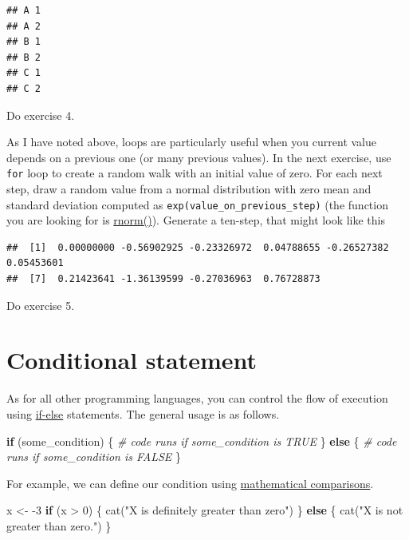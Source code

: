 \documentclass[
]{book}
\newenvironment{Shaded}{\begin{snugshade}}{\end{snugshade}}
\newcommand{\CommentTok}[1]{\textcolor[rgb]{0.56,0.35,0.01}{\textit{#1}}}
\newcommand{\ControlFlowTok}[1]{\textcolor[rgb]{0.13,0.29,0.53}{\textbf{#1}}}
\newcommand{\DecValTok}[1]{\textcolor[rgb]{0.00,0.00,0.81}{#1}}
\newcommand{\FunctionTok}[1]{\textcolor[rgb]{0.00,0.00,0.00}{#1}}
\newcommand{\NormalTok}[1]{#1}
\newcommand{\OtherTok}[1]{\textcolor[rgb]{0.56,0.35,0.01}{#1}}
\newcommand{\SpecialCharTok}[1]{\textcolor[rgb]{0.00,0.00,0.00}{#1}}
\newcommand{\StringTok}[1]{\textcolor[rgb]{0.31,0.60,0.02}{#1}}
\begin{document}
\begin{verbatim}
## A 1 
## A 2 
## B 1 
## B 2 
## C 1 
## C 2
\end{verbatim}

Do exercise 4.

As I have noted above, loops are particularly useful when you current value depends on a previous one (or many previous values). In the next exercise, use \texttt{for} loop to create a random walk with an initial value of zero. For each next step, draw a random value from a normal distribution with zero mean and standard deviation computed as \texttt{exp(value\_on\_previous\_step)} (the function you are looking for is \href{https://stat.ethz.ch/R-manual/R-devel/library/stats/html/Normal.html}{rnorm()}). Generate a ten-step, that might look like this

\begin{verbatim}
##  [1]  0.00000000 -0.56902925 -0.23326972  0.04788655 -0.26527382  0.05453601
##  [7]  0.21423641 -1.36139599 -0.27036963  0.76728873
\end{verbatim}

Do exercise 5.

\hypertarget{conditional-statement}{%
\section{Conditional statement}\label{conditional-statement}}

As for all other programming languages, you can control the flow of execution using \href{https://stat.ethz.ch/R-manual/R-devel/library/base/html/Control.html}{if-else} statements. The general usage is as follows.

\begin{Shaded}
\begin{Highlighting}[]
\ControlFlowTok{if}\NormalTok{ (some\_condition) \{}
  \CommentTok{\# code runs if some\_condition is TRUE}
\NormalTok{\} }\ControlFlowTok{else}\NormalTok{ \{}
  \CommentTok{\# code runs if some\_condition is FALSE}
\NormalTok{\}}
\end{Highlighting}
\end{Shaded}

For example, we can define our condition using \href{https://stat.ethz.ch/R-manual/R-devel/library/base/html/Comparison.html}{mathematical comparisons}.

\begin{Shaded}
\begin{Highlighting}[]
\NormalTok{x }\OtherTok{\textless{}{-}} \SpecialCharTok{{-}}\DecValTok{3}
\ControlFlowTok{if}\NormalTok{ (x }\SpecialCharTok{\textgreater{}} \DecValTok{0}\NormalTok{) \{}
  \FunctionTok{cat}\NormalTok{(}\StringTok{"X is definitely greater than  zero"}\NormalTok{)}
\NormalTok{\} }\ControlFlowTok{else}\NormalTok{ \{}
  \FunctionTok{cat}\NormalTok{(}\StringTok{"X is not greater than zero."}\NormalTok{)}
\NormalTok{\}}
\end{Highlighting}
\end{Shaded}
\end{document}
